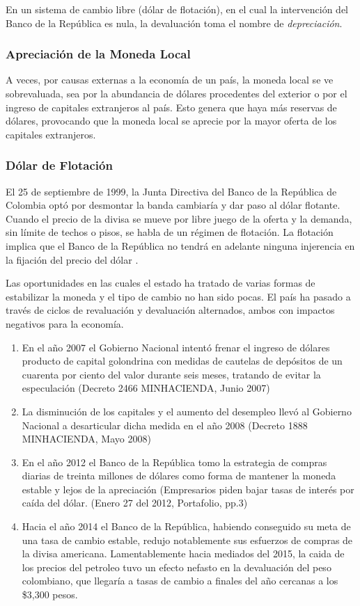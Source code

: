 En un sistema de cambio libre (dólar de flotación), en el cual la intervención del Banco de la República es nula, la devaluación toma el nombre de \textit{depreciación}. 

\subsubsection{Apreciación de la Moneda Local}
A veces, por causas externas a la economía de un país, la moneda local se ve sobrevaluada, sea por la abundancia de dólares procedentes del exterior o por el ingreso de capitales extranjeros al país. Esto genera que haya más reservas de dólares, provocando que la moneda local se aprecie por la mayor oferta de los capitales extranjeros. 

\subsubsection{Dólar de Flotación}
El 25 de septiembre de 1999, la Junta Directiva del Banco de la República de Colombia optó por desmontar la banda cambiaría y dar paso al dólar flotante. Cuando el precio de la divisa se mueve por libre juego de la oferta y la demanda, sin límite de techos o pisos, se habla de un régimen de flotación. La flotación implica que el Banco de la República no tendrá en adelante ninguna injerencia en la fijación del precio del dólar \cite{cardenas}. 

Las oportunidades en las cuales el estado ha tratado de varias formas de estabilizar la moneda y el tipo de cambio no han sido pocas. El país ha pasado a través de ciclos de revaluación y devaluación alternados, ambos con impactos negativos para la economía. 

\begin{enumerate}
	\item En el año 2007 el Gobierno Nacional intentó frenar el ingreso de dólares producto de capital golondrina con medidas de cautelas de depósitos de un cuarenta por ciento del valor durante seis meses, tratando de evitar la especulación (Decreto 2466 MINHACIENDA, Junio 2007)
	\item La disminución de los capitales y el aumento del desempleo llevó al Gobierno Nacional a desarticular dicha medida en el año 2008 (Decreto 1888 MINHACIENDA, Mayo 2008)
	\item En el año 2012 el Banco de la República tomo la estrategia de compras diarias de treinta millones de dólares como forma de mantener la moneda estable y lejos de la apreciación (Empresarios piden bajar tasas de interés por caída del dólar. (Enero 27 del 2012, Portafolio, pp.3)
	\item Hacia el año 2014 el Banco de la República, habiendo conseguido su meta de una tasa de cambio estable, redujo notablemente sus esfuerzos de compras de la divisa americana. Lamentablemente hacia mediados del 2015, la caida de los precios del petroleo tuvo un efecto nefasto en la devaluación del peso colombiano, que llegaría a tasas de cambio a finales del año cercanas a los \$3,300 pesos. 
\end{enumerate}

